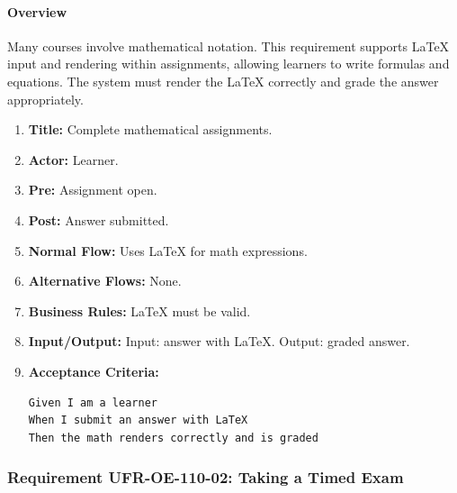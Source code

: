 \paragraph{Overview}
Many courses involve mathematical notation. This requirement supports LaTeX input and rendering within assignments, allowing learners to write formulas and equations. The system must render the LaTeX correctly and grade the answer appropriately.
\begin{enumerate}[label=\textbf{\arabic*.}]
\item \textbf{Title:} Complete mathematical assignments.
\item \textbf{Actor:} Learner.
\item \textbf{Pre:} Assignment open.
\item \textbf{Post:} Answer submitted.
\item \textbf{Normal Flow:} Uses LaTeX for math expressions.
\item \textbf{Alternative Flows:} None.
\item \textbf{Business Rules:} LaTeX must be valid.
\item \textbf{Input/Output:} Input: answer with LaTeX. Output: graded answer.
\item \textbf{Acceptance Criteria:}
    \begin{verbatim}
Given I am a learner
When I submit an answer with LaTeX
Then the math renders correctly and is graded
    \end{verbatim}
\end{enumerate}

\subsubsection{Requirement UFR-OE-110-02: Taking a Timed Exam}
